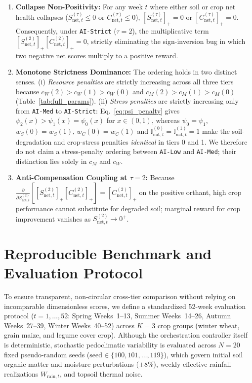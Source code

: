 \documentclass[11pt,a4paper]{article}
\newcommand{\pos}[1]{\left[#1\right]_{+}}
\newcommand{\Inatt}{\mathbb{I}_{\mathrm{nat},t}}
\begin{document}
\begin{enumerate}
  \item \textbf{Collapse Non-Positivity:} For any week $t$ where either soil or crop net health collapses ($S_{\mathrm{net},t}^{(\tau)} \le 0$ or $C_{\mathrm{net},t}^{(\tau)} \le 0$), $\pos{S_{\mathrm{net},t}^{(\tau)}} = 0$ or $\pos{C_{\mathrm{net},t}^{(\tau)}} = 0$. Consequently, under \texttt{AI-Strict} ($\tau=2$), the multiplicative term $\pos{S_{\mathrm{net},t}^{(2)}}\pos{C_{\mathrm{net},t}^{(2)}} = 0$, strictly eliminating the sign-inversion bug in which two negative net scores multiply to a positive reward.
  \item \textbf{Monotone Strictness Dominance:} The ordering holds in two distinct senses. (i) \emph{Resource penalties} are strictly increasing across all three tiers because $c_W(2) > c_W(1) > c_W(0)$ and $c_M(2) > c_M(1) > c_M(0)$ (Table~\ref{tab:full_params}). (ii) \emph{Stress penalties} are strictly increasing only from \texttt{AI-Med} to \texttt{AI-Strict}: Eq.~\eqref{eq:psi_penalty} gives $\psi_2(x) > \psi_1(x) = \psi_0(x)$ for $x\in(0,1)$, whereas $\psi_0=\psi_1$, $w_S(0)=w_S(1)$, $w_C(0)=w_C(1)$ and $\Inatt^{(0)}=\Inatt^{(1)}=1$ make the soil-degradation and crop-stress penalties \emph{identical} in tiers 0 and 1. We therefore do not claim a stress-penalty ordering between \texttt{AI-Low} and \texttt{AI-Med}; their distinction lies solely in $c_M$ and $c_W$.
  \item \textbf{Anti-Compensation Coupling at $\tau=2$:} Because $\frac{\partial}{\partial S_{\mathrm{net},t}^{(2)}}\left[\pos{S_{\mathrm{net},t}^{(2)}}\pos{C_{\mathrm{net},t}^{(2)}}\right] = \pos{C_{\mathrm{net},t}^{(2)}}$ on the positive orthant, high crop performance cannot substitute for degraded soil; marginal reward for crop improvement vanishes as $S_{\mathrm{net},t}^{(2)} \to 0^+$.
\end{enumerate}

\section{Reproducible Benchmark and Evaluation Protocol}
To ensure transparent, non-circular cross-tier comparison without relying on incomparable dimensionless scores, we define a standardized 52-week evaluation protocol ($t = 1,\dots,52$: Spring Weeks~1--13, Summer Weeks~14--26, Autumn Weeks~27--39, Winter Weeks~40--52) across $K=3$ crop groups (winter wheat, grain maize, and legume cover crop). Although the orchestration controller itself is deterministic, stochastic pedoclimatic variability is evaluated across $N = 20$ fixed pseudo-random seeds ($\mathrm{seed} \in \{100, 101, \dots, 119\}$), which govern initial soil organic matter and moisture perturbations ($\pm 8\%$), weekly effective rainfall realizations $W_{\mathrm{rain},t}$, and topsoil thermal noise.
\end{document}
